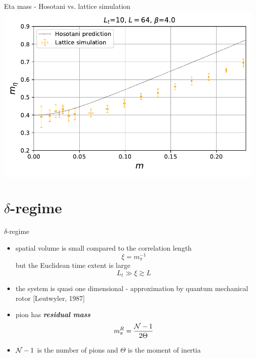 \documentclass[english]{beamer}
\begin{document}
\begin{frame}{Eta mass - Hosotani vs. lattice simulation}
  \includegraphics[width=1\textwidth]{figs/Meta64x10FiniteT_Pt3}
\end{frame}


\section{$\delta$-regime}

\begin{frame}{$\delta$-regime}
  \begin{itemize}
    \item spatial volume is small compared to the correlation
      length
      \[
        \xi = m_\pi^{-1}
      \]
      but the Euclidean time extent is large
      \[
        L_t\gg \xi \gtrsim L
      \]
    \item the system is quasi one dimensional - approximation by
      quantum mechanical rotor [Leutwyler, 1987]
    \item pion has \textbf{\textit{residual mass}}
      \[
        m_\pi^R = \frac{{\cal N} - 1}{2\Theta}
      \]
    \item ${\cal N} - 1$ is the number of pions and $\Theta$ is the moment of inertia
  \end{itemize}
\end{frame}
\end{document}
